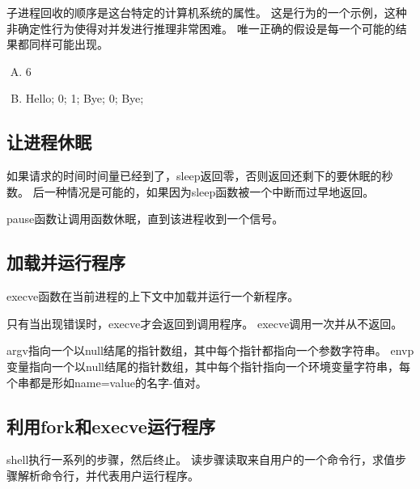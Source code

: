 {{{            子进程回收的顺序是这台特定的计算机系统的属性。
            这是行为的一个示例，这种非确定性行为使得对并发进行推理非常困难。
            唯一正确的假设是每一个可能的结果都同样可能出现。

            \begin{practicec}
                \begin{enumerate}[A.]
                    \item 6
                    \item
                    {
                        Hello;
                        0;
                        1;
                        Bye;
                        0;
                        Bye;
                    }
                \end{enumerate}
            \end{practicec}
        }
    }

    \subsection{让进程休眠}
    {
        如果请求的时间时间量已经到了，sleep返回零，否则返回还剩下的要休眠的秒数。
        后一种情况是可能的，如果因为sleep函数被一个中断而过早地返回。

        pause函数让调用函数休眠，直到该进程收到一个信号。

        \begin{practicec}

        \end{practicec}
    }

    \subsection{加载并运行程序}
    {
        execve函数在当前进程的上下文中加载并运行一个新程序。

        只有当出现错误时，execve才会返回到调用程序。
        execve调用一次并从不返回。

        argv指向一个以null结尾的指针数组，其中每个指针都指向一个参数字符串。
        envp变量指向一个以null结尾的指针数组，其中每个指针指向一个环境变量字符串，每个串都是形如name=value的名字-值对。

        \begin{practicec}

        \end{practicec}
    }

    \subsection{利用fork和execve运行程序}
    {
        shell执行一系列的步骤，然后终止。
        读步骤读取来自用户的一个命令行，求值步骤解析命令行，并代表用户运行程序。

}}

